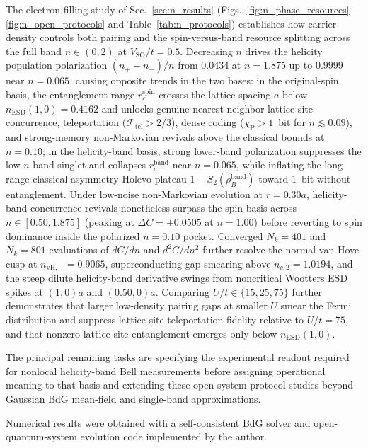 \documentclass[aps,prb,twocolumn,superscriptaddress,longbibliography]{revtex4-2}
\begin{document}
The electron-filling study of Sec.~\ref{sec:n_results}
(Figs.~\ref{fig:n_phase_resources}--\ref{fig:n_open_protocols} and
Table~\ref{tab:n_protocols}) establishes how carrier density controls
both pairing and the spin-versus-band resource splitting across the full
band $n\in(0,2)$ at $V_{\mathrm{SO}}/t=0.5$. Decreasing $n$ drives the
helicity population polarization $(n_+-n_-)/n$ from $0.0434$ at $n=1.875$
up to $0.9999$ near $n=0.065$, causing opposite trends in the two
bases: in the original-spin basis, the entanglement range
$r_c^{\mathrm{spin}}$ crosses the lattice spacing $a$ below
$n_{\mathrm{ESD}}(1,0)=0.4162$ and unlocks genuine nearest-neighbor
lattice-site concurrence, teleportation ($\overline{\mathcal{F}}_{\mathrm{tel}}>2/3$),
dense coding ($\chi_{\mathrm{P}}>1$~bit for $n\lesssim 0.09$), and
strong-memory non-Markovian revivals above the classical bounds at
$n=0.10$; in the helicity-band basis, strong lower-band polarization
suppresses the low-$n$ band singlet and collapses $r_c^{\mathrm{band}}$
near $n=0.065$, while inflating the long-range classical-asymmetry Holevo
plateau $1-S_2(\rho_B^{\mathrm{band}})$ toward $1$~bit without
entanglement. Under low-noise non-Markovian evolution at $r=0.30a$,
helicity-band concurrence revivals nonetheless surpass the spin basis
across $n\in[0.50,1.875]$ (peaking at $\Delta C=+0.0505$ at $n=1.00$)
before reverting to spin dominance inside the polarized $n=0.10$ pocket.
Converged $N_k=401$ and $N_k=801$ evaluations of $dC/dn$ and
$d^2C/dn^2$ further resolve the normal van Hove cusp at
$n_{\mathrm{vH},-}=0.9065$, superconducting gap smearing above
$n_{c,2}=1.0194$, and the steep dilute helicity-band derivative swings
from noncritical Wootters ESD spikes at $(1,0)a$ and $(0.50,0)a$.
Comparing $U/t\in\{15,25,75\}$ further demonstrates that larger
low-density pairing gaps at smaller $U$ smear the Fermi distribution
and suppress lattice-site teleportation fidelity relative to $U/t=75$,
and that nonzero lattice-site entanglement emerges only below
$n_{\mathrm{ESD}}(1,0)$.

The principal remaining tasks are specifying the experimental readout
required for nonlocal helicity-band Bell measurements before assigning
operational meaning to that basis and extending these open-system
protocol studies beyond Gaussian BdG mean-field and single-band
approximations.

\begin{acknowledgments}
Numerical results were obtained with a self-consistent BdG solver and open-quantum-system evolution code implemented by the author.
\end{acknowledgments}
\end{document}
